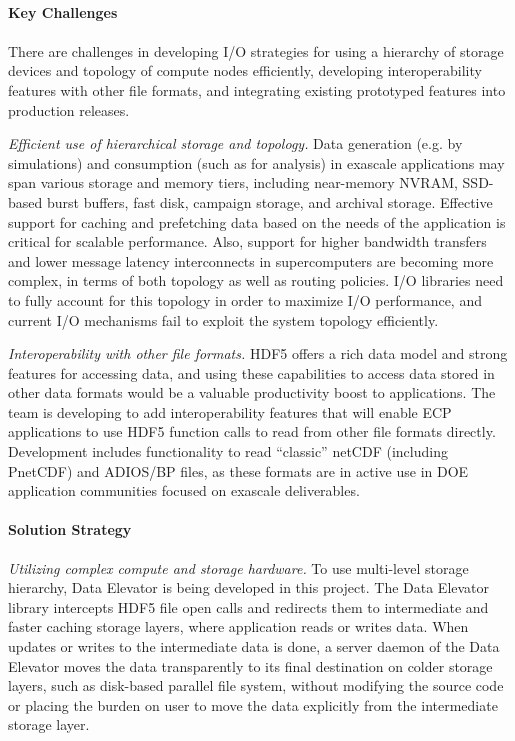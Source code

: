 \paragraph{Key  Challenges}
\paragraph{}
There are challenges in developing I/O strategies for using a hierarchy of storage devices and topology of compute nodes efficiently, developing interoperability features with other file formats, and integrating existing prototyped features into production releases. 

\textit{Efficient use of hierarchical storage and topology.} Data generation (e.g. by simulations) and consumption (such as for analysis) in exascale applications may span various storage and memory tiers, including near-memory NVRAM, SSD-based burst buffers, fast disk, campaign storage, and archival storage. Effective support for caching and prefetching data based on the needs of the application is critical for scalable performance. Also, support for higher bandwidth transfers and lower message latency interconnects in supercomputers are becoming more complex, in terms of both topology as well as routing policies. I/O libraries need to fully account for this topology in order to
maximize I/O performance, and current I/O mechanisms fail to exploit the system topology efficiently.

\textit{Interoperability with other file formats.} HDF5 offers a rich data model and strong features for accessing data, and using these capabilities to access data stored in other data formats would be a valuable productivity boost to applications. The team is developing to add interoperability features that will enable ECP applications to use HDF5 function calls to read from other file formats directly. Development includes functionality to read “classic” netCDF (including PnetCDF) and ADIOS/BP files, as these formats are in active use in DOE application communities focused on exascale deliverables. 

\paragraph{Solution Strategy}

\textit{Utilizing complex compute and storage hardware. } To use multi-level storage hierarchy, Data Elevator is being developed in this project. The Data Elevator library intercepts HDF5 file open calls and redirects them to intermediate and faster caching storage layers, where application reads or writes data. When updates or writes to the intermediate data is done, a server daemon of the Data Elevator moves the data transparently to its final destination on colder storage layers, such as disk-based parallel file system, without modifying the source code or placing the burden on user to move the data explicitly from the intermediate storage layer.

